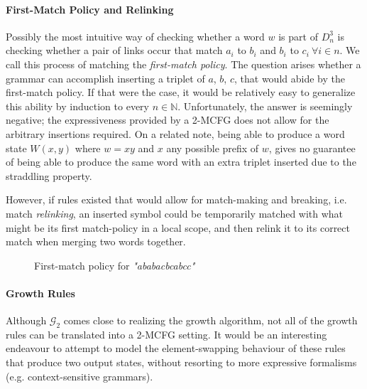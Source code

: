 \documentclass{llncs}
\newcommand{\w}[1]{\textit{"#1"}}
\begin{document}
\paragraph{\textbf{First-Match Policy and Relinking}}
Possibly the most intuitive way of checking whether a word $w$ is part of $D^3_n$ is checking whether a pair of links occur that match $a_i$ to $b_i$ and $b_i$ to $c_i \ \forall i \in n$. We call this process of matching the \textit{first-match policy}. The question arises whether a grammar can accomplish inserting a triplet of $a$, $b$, $c$, that would abide by the first-match policy. If that were the case, it would be relatively easy to generalize this ability by induction to every $n \in \mathbb{N}$. Unfortunately, the answer is seemingly negative; the expressiveness provided by a 2-MCFG does not allow for the arbitrary insertions required. On a related note, being able to produce a word state $W(x,y)$ where $w=xy$ and $x$ any possible prefix of $w$, gives no guarantee of being able to produce the same word with an extra triplet inserted due to the straddling property. 

However, if rules existed that would allow for match-making and breaking, i.e. match \textit{relinking}, an inserted symbol could be temporarily matched with what might be its first match-policy in a local scope, and then relink it to its correct match when merging two words together.
\begin{figure}[h]
\centering
{}
\caption{First-match policy for \w{ababacbcabcc}}
\label{fig:fmp}
\end{figure}
\paragraph{\textbf{Growth Rules}}
Although $\mathcal{G}_2$ comes close to realizing the growth algorithm, not all of the growth rules can be translated into a 2-MCFG setting. It would be an interesting endeavour to attempt to model the element-swapping behaviour of these rules that produce two output states, without resorting to more expressive formalisms (e.g. context-sensitive grammars).
\end{document}

